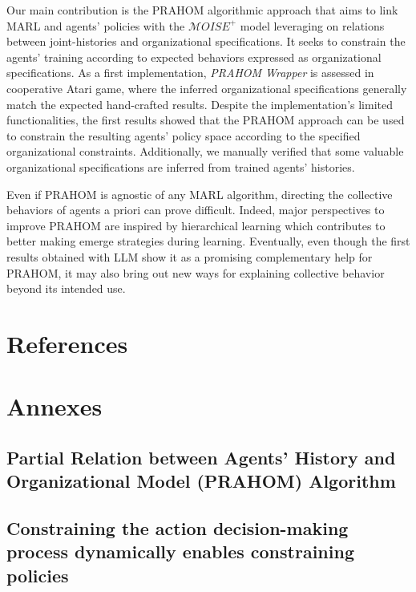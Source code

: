 \documentclass[runningheads]{llncs}
\theoremstyle{freethm}
\theoremstyle{proofoutline}
\newcounter{relation}
\newcounter{proof}
\begin{document}

Our main contribution is the PRAHOM algorithmic approach that aims to link MARL and agents' policies with the $\mathcal{M}OISE^+$ model leveraging on relations between joint-histories and organizational specifications. It seeks to constrain the agents' training according to expected behaviors expressed as organizational specifications.
As a first implementation, \emph{PRAHOM Wrapper} is assessed in cooperative Atari game, where the inferred organizational specifications generally match the expected hand-crafted results.
Despite the implementation's limited functionalities, the first results showed that the PRAHOM approach can be used to constrain the resulting agents' policy space according to the specified organizational constraints. Additionally, we manually verified that some valuable organizational specifications are inferred from trained agents' histories.

Even if PRAHOM is agnostic of any MARL algorithm, directing the collective behaviors of agents a priori can prove difficult. Indeed, major perspectives to improve PRAHOM are inspired by hierarchical learning which contributes to better making emerge strategies during learning.
Eventually, even though the first results obtained with LLM show it as a promising complementary help for PRAHOM, it may also bring out new ways for explaining collective behavior beyond its intended use.


\section*{References}





\newpage

\section*{Annexes}\label{proof:jpc_to_ac}

\subsection*{Partial Relation between Agents' History and Organizational Model (PRAHOM) Algorithm}


\subsection*{Constraining the action decision-making process dynamically enables constraining policies}

\end{document}
